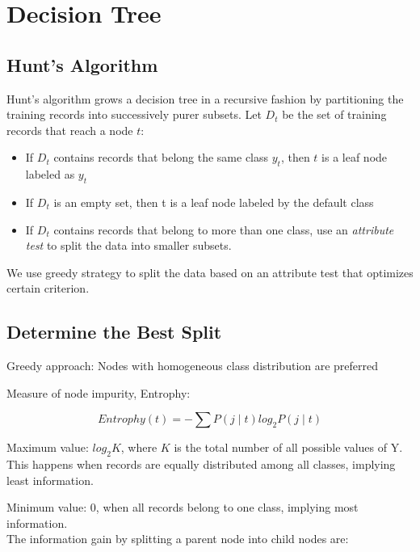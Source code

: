 \chapter{Decision Tree}

\begin{multicols*}{2}
\section{Hunt's Algorithm}

\noindent Hunt's algorithm grows a decision tree in a recursive fashion by partitioning the training records into successively purer subsets. Let $D_t$ be the set of training records that reach a node $t$:

\begin{itemize}
    \item If $D_t$ contains records that belong the same class $y_t$, then $t$ is a leaf node labeled as $y_t$
    \item If $D_t$ is an empty set, then t is a leaf node labeled by the default class
    \item If $D_t$ contains records that belong to more than one class, use an \textit{attribute test} to split the data into smaller subsets.
\end{itemize}

\noindent We use greedy strategy to split the data based on an attribute test that optimizes certain criterion. 

\section{Determine the Best Split}

\noindent Greedy approach: Nodes with homogeneous class distribution are preferred

\noindent Measure of node impurity, Entrophy:

$$Entrophy(t)=-\sum P(j \mid t) log_2 P(j \mid t)$$ 

\noindent Maximum value: $log_{2} K$, where $K$ is the total number of all possible values of Y. This happens when records are equally distributed among all classes, implying least information. 

\noindent Minimum value: 0, when all records belong to one class, implying most information. \\

\noindent The information gain by splitting a parent node into child nodes are:


\end{multicols*}
